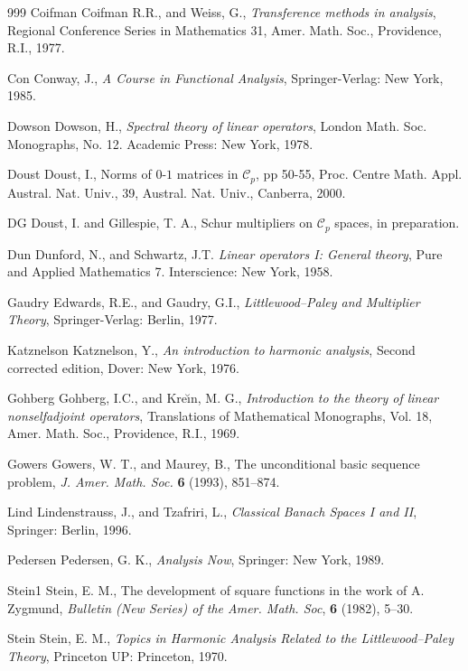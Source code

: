 \documentclass[mmath,12pt]{unswthesis}   %
\newcommand{\CC}{\mathcal{C}}
\numberwithin{equation}{section}
\begin{document}
\begin{thebibliography}{999}
\bibitem
{Coifman} Coifman R.R., and Weiss, G.,
\textit{Transference methods in analysis},
Regional Conference Series in Mathematics 31,
Amer. Math. Soc., Providence, R.I., 1977.

\bibitem
{Con} Conway, J.,
\textit{A Course in Functional Analysis},
Springer-Verlag: New York, 1985.

\bibitem
{Dowson} Dowson, H.,
\textit{Spectral theory of linear operators},
London Math. Soc. Monographs, No. 12. Academic Press: New York, 1978.

\bibitem
{Doust} 
Doust, I., Norms of $0$-$1$ matrices in $\CC_p$,  pp 50-55, Proc.
Centre Math. Appl. Austral. Nat. Univ., 39, Austral. Nat. Univ.,
Canberra, 2000.

\bibitem
{DG} Doust, I.  and Gillespie, T. A.,
Schur multipliers on $\CC_p$ spaces,
in preparation.

\bibitem
{Dun} Dunford, N., and Schwartz, J.T.
\textit{Linear operators I: General theory},
Pure and Applied Mathematics 7. Interscience: New York, 1958.

\bibitem
{Gaudry} Edwards, R.E., and Gaudry, G.I.,
\textit{Littlewood--Paley and Multiplier Theory},
Springer-Verlag: Berlin, 1977.

\bibitem
{Katznelson}
Katznelson, Y.,
\textit{An introduction to harmonic analysis},
Second corrected edition, Dover: New York, 1976.

\bibitem
{Gohberg}
Gohberg, I.C., and Kre\u{\i}n, M. G.,
\textit{Introduction to the theory of linear nonselfadjoint operators},
Translations of Mathematical Monographs, Vol. 18, Amer. Math. Soc.,
Providence, R.I., 1969.

\bibitem
{Gowers} Gowers, W. T., and Maurey, B.,
The unconditional basic sequence problem,
\textit{J. Amer. Math. Soc.} \textbf{6} (1993), 851--874.

\bibitem
{Lind}
Lindenstrauss, J., and Tzafriri, L.,
\textit{Classical Banach Spaces I and II},
Springer: Berlin, 1996.

\bibitem
{Pedersen}
Pedersen, G. K.,
\textit{Analysis Now},
Springer: New York, 1989.

\bibitem
{Stein1}
Stein, E. M.,
The development of square functions in the work of A. Zygmund,
\textit{Bulletin (New Series) of the Amer. Math. Soc},
\textbf{6} (1982), 5--30.

\bibitem
{Stein}
Stein, E. M.,
\textit{Topics in Harmonic Analysis Related to the Littlewood--Paley Theory},
Princeton UP: Princeton, 1970.

\end{thebibliography}
\end{document}
